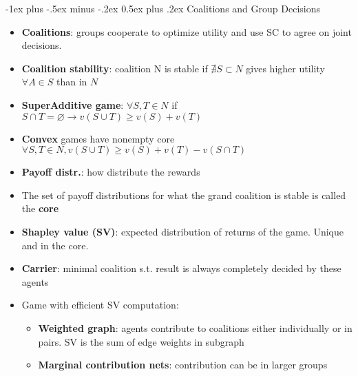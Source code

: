 \documentclass[10pt,a4paper,landscape]{article}
\makeatletter
\renewcommand{\section}{\@startsection{section}{1}{0mm}%
                                {-1ex plus -.5ex minus -.2ex}%
                                {0.5ex plus .2ex}%
                                {\normalfont\small\bfseries}}
\makeatother
\begin{document}
\begin{multicols*}{2}
\section{Coalitions and Group Decisions}
\begin{itemize}
	\item \textbf{Coalitions}: groups cooperate to optimize utility and use SC to agree on joint decisions.
	\item \textbf{Coalition stability}: coalition N is stable if $ \nexists S \subset N$ gives higher utility $\forall A \in S$ than in $N$
	\item \textbf{SuperAdditive game}: 
	$\forall S,T \in N$ if $S \cap T = \varnothing \rightarrow v(S \cup T) \geq v(S) + v(T)$
	\item \textbf{Convex} games have nonempty core\\
	$\forall S,T \in N, v(S \cup T) \geq v(S) + v(T) - v(S \cap T)$
	\item \textbf{Payoff distr.}: how distribute the rewards
	\item The set of payoff distributions for what the grand coalition is stable is called the \textbf{core} 
	\item \textbf{Shapley value (SV)}: expected distribution of returns of the game. Unique and in the core. 
	\item \textbf{Carrier}: minimal coalition s.t. result is always completely decided by these agents
	\item Game with efficient SV computation:
	\begin{itemize}
		\item \textbf{Weighted graph}: agents contribute to coalitions either individually or in pairs. SV is the sum of edge weights in subgraph
		\item \textbf{Marginal contribution nets}: contribution can be in larger groups
	\end{itemize}
	
\end{itemize}

\end{multicols*}
\end{document}
